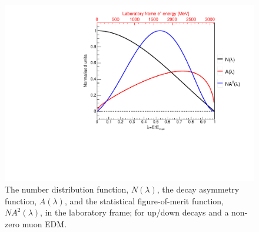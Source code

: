 \begin{figure}[t!]
\centering{}
\includegraphics[trim={0 0 0 0},clip,width=.69\textwidth]{Images/Chapter2/Asymmetry_EDM_labFrame.pdf}
\caption{The number distribution function, $N(\lambda)$, the decay asymmetry function, $A(\lambda)$, and the statistical figure-of-merit function, $NA^{2}(\lambda)$, in the laboratory frame; for up/down decays and a non-zero muon EDM.}
\label{fig:Asymmetry_EDM}
\end{figure}


